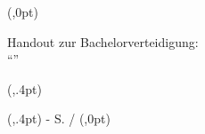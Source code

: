 %
    {
        (\textwidth,0pt)%
        {
        }
        {
        }
        {
            \parbox{\textwidth}{
                \centering
                {\footnotesize \sffamily Handout zur Bachelorverteidigung:}\\
                \enquote{\large \thesisTitle}
            }            
        }
        (\textwidth,.4pt)
    }
    {
        (\textwidth,.4pt)%
        {
        }
        {
        }
        {
            \centering
            \footnotesize
            \textbf{\thesisAuthor}\hfill{\scriptsize\thesisUniversity{} - \thesisUniversityDepartment{}}\hfill
            S. \pagemark{} / \pageref{lastpage}
        }%
        (\textwidth,0pt)
    }

\setlength{\headsep}{12mm}